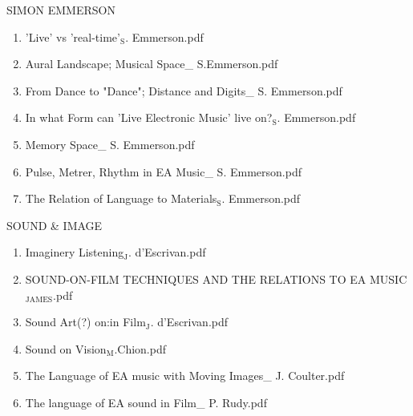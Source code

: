 \documentclass[11pt]{article}
\begin{document}
\item SIMON EMMERSON
\label{sec-1-1-1-1-49-1-31}
\begin{enumerate}
\item 'Live' vs 'real-time'$_{\text{S}}$. Emmerson.pdf
\label{sec-1-1-1-1-49-1-31-1}

\item Aural Landscape; Musical Space\_ S.Emmerson.pdf
\label{sec-1-1-1-1-49-1-31-2}

\item From Dance to "Dance"; Distance and Digits\_ S. Emmerson.pdf
\label{sec-1-1-1-1-49-1-31-3}

\item In what Form can 'Live Electronic Music' live on?$_{\text{S}}$. Emmerson.pdf
\label{sec-1-1-1-1-49-1-31-4}

\item Memory Space\_ S. Emmerson.pdf
\label{sec-1-1-1-1-49-1-31-5}

\item Pulse, Metrer, Rhythm in EA Music\_ S. Emmerson.pdf
\label{sec-1-1-1-1-49-1-31-6}

\item The Relation of Language to Materials$_{\text{S}}$. Emmerson.pdf
\label{sec-1-1-1-1-49-1-31-7}
\end{enumerate}

\item SOUND \& IMAGE
\label{sec-1-1-1-1-49-1-32}
\begin{enumerate}
\item Imaginery Listening$_{\text{J}}$. d'Escrivan.pdf
\label{sec-1-1-1-1-49-1-32-1}

\item SOUND-ON-FILM TECHNIQUES AND THE RELATIONS TO EA MUSIC$_{\text{JAMES}}$.pdf
\label{sec-1-1-1-1-49-1-32-2}

\item Sound Art(?) on:in Film$_{\text{J}}$. d'Escrivan.pdf
\label{sec-1-1-1-1-49-1-32-3}

\item Sound on Vision$_{\text{M}}$.Chion.pdf
\label{sec-1-1-1-1-49-1-32-4}

\item The Language of EA music with Moving Images\_ J. Coulter.pdf
\label{sec-1-1-1-1-49-1-32-5}

\item The language of EA sound in Film\_ P. Rudy.pdf
\label{sec-1-1-1-1-49-1-32-6}
\end{enumerate}
\end{document}
